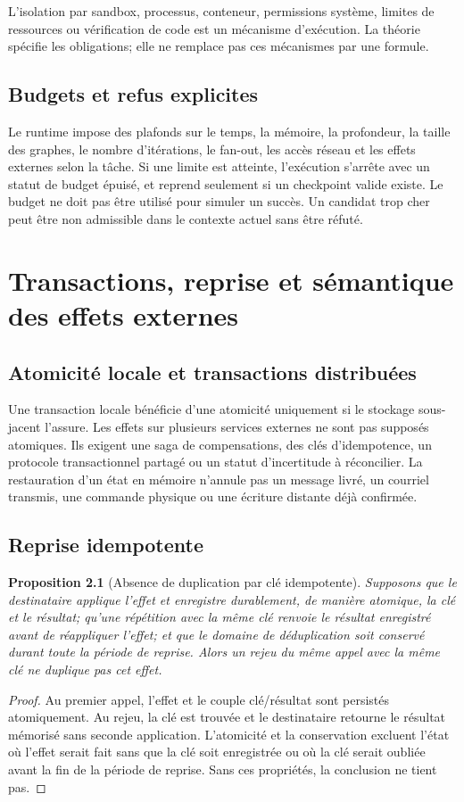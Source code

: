 \documentclass[11pt,a4paper,openany]{book}
\theoremstyle{definition}
\theoremstyle{plain}
\newtheorem{proposition}[definition]{Proposition}
\theoremstyle{remark}
\begin{document}
L'isolation par sandbox, processus, conteneur, permissions système, limites de ressources ou vérification de code est un mécanisme d'exécution. La théorie spécifie les obligations; elle ne remplace pas ces mécanismes par une formule.

\section{Budgets et refus explicites}
Le runtime impose des plafonds sur le temps, la mémoire, la profondeur, la taille des graphes, le nombre d'itérations, le fan-out, les accès réseau et les effets externes selon la tâche. Si une limite est atteinte, l'exécution s'arrête avec un statut de budget épuisé, et reprend seulement si un checkpoint valide existe. Le budget ne doit pas être utilisé pour simuler un succès. Un candidat trop cher peut être non admissible dans le contexte actuel sans être réfuté.

\chapter{Transactions, reprise et sémantique des effets externes}
\section{Atomicité locale et transactions distribuées}
Une transaction locale bénéficie d'une atomicité uniquement si le stockage sous-jacent l'assure. Les effets sur plusieurs services externes ne sont pas supposés atomiques. Ils exigent une saga de compensations, des clés d'idempotence, un protocole transactionnel partagé ou un statut d'incertitude à réconcilier. La restauration d'un état en mémoire n'annule pas un message livré, un courriel transmis, une commande physique ou une écriture distante déjà confirmée.

\section{Reprise idempotente}
\begin{proposition}[Absence de duplication par clé idempotente]
Supposons que le destinataire applique l'effet et enregistre durablement, de manière atomique, la clé et le résultat; qu'une répétition avec la même clé renvoie le résultat enregistré avant de réappliquer l'effet; et que le domaine de déduplication soit conservé durant toute la période de reprise. Alors un rejeu du même appel avec la même clé ne duplique pas cet effet.
\end{proposition}
\begin{proof}
Au premier appel, l'effet et le couple clé/résultat sont persistés atomiquement. Au rejeu, la clé est trouvée et le destinataire retourne le résultat mémorisé sans seconde application. L'atomicité et la conservation excluent l'état où l'effet serait fait sans que la clé soit enregistrée ou où la clé serait oubliée avant la fin de la période de reprise. Sans ces propriétés, la conclusion ne tient pas.
\end{proof}
\end{document}
